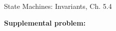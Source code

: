 \documentclass[handout]{mcs}
\begin{document}

\begin{staffnotes}
State Machines: Invariants, Ch. 5.4
\end{staffnotes}





\textbf{Supplemental problem:}



\end{document}
